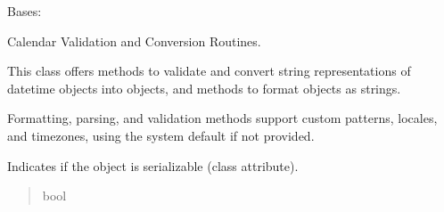 \documentclass[letterpaper,10pt,english]{sphinxmanual}
\begin{document}
\begin{fulllineitems}
\label{\detokenize{apache_commons_validator_python.routines:apache_commons_validator_python.routines.calendar_validator.CalendarValidator}}
\pysigstartsignatures
{}
\pysigstopsignatures
\sphinxAtStartPar
Bases: 

\sphinxAtStartPar
Calendar Validation and Conversion Routines.

\sphinxAtStartPar
This class offers methods to validate and convert string representations of datetime
objects into  objects, and methods to format  objects as strings.

\sphinxAtStartPar
Formatting, parsing, and validation methods support custom patterns, locales, and timezones,
using the system default if not provided.

\begin{fulllineitems}
\label{\detokenize{apache_commons_validator_python.routines:apache_commons_validator_python.routines.calendar_validator.CalendarValidator.serializable}}
\pysigstartsignatures
{}
\pysigstopsignatures
\sphinxAtStartPar
Indicates if the object is serializable (class attribute).
\begin{quote}\begin{description}
\sphinxAtStartPar
bool

\end{description}\end{quote}

\end{fulllineitems}


\end{fulllineitems}
\end{document}
